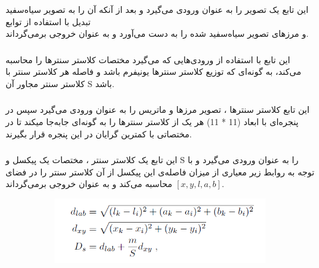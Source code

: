 \documentclass[a4paper,12pt]{article}
\begin{document}
\subsubsection*{}
این تابع یک تصویر را به عنوان ورودی می‌گیرد و بعد از آنکه آن را به تصویر سیاه‌سفید تبدیل با استفاده از توابع \\
 و 
مرزهای تصویر سیاه‌سفید شده را به دست می‌آورد و به عنوان خروجی بر‌می‌گرداند.
\subsubsection*{}
این تابع با استفاده از ورودی‌هایی که می‌گیرد مختصات کلاستر سنترها را محاسبه می‌کند، به گونه‌ای که توزیع کلاستر سنترها یونیفرم باشد و فاصله هر کلاستر سنتر با کلاستر سنتر مجاور آن S باشد.
\subsubsection*{}
این تابع کلاستر سنترها ، تصویر مرزها و ماتریس 
را به عنوان ورودی می‌گیرد سپس در پنجره‌ای با ابعاد 
(11 * 11)
هر یک از کلاستر سنترها را به گونه‌ای جابه‌جا میکند تا در مختصاتی با کمترین گرایان در این پنجره قرار بگیرند.
\subsubsection*{}
این تابع یک کلاستر سنتر ، مختصات یک پیکسل و S را به عنوان ورودی می‌گیرد و با توجه به روابط زیر معیاری از میزان فاصله‌ی این پیکسل از آن کلاستر سنتر را در فضای 
$ [x, y, l, a, b] $
محاسبه می‌کند و به عنوان خروجی برمی‌گرداند.
\begin{figure}[H]
	\centering
	\begin{subfigure}{0.5\textwidth}
		\centering
		\includegraphics[width=\textwidth]{1.png}
	\end{subfigure}
\end{figure}
\end{document}
